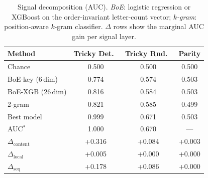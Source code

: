 \begin{table}[t]
\centering
\small
\caption{Signal decomposition (AUC). \emph{BoE}: logistic regression or XGBoost on the order-invariant letter-count vector; \emph{$k$-gram}: position-aware $k$-gram classifier. $\Delta$ rows show the marginal AUC gain per signal layer.}
\label{tab:signal_decomposition}
\begin{tabular}{l c c c}
\toprule
Method & Tricky Det.\ & Tricky Rnd.\ & Parity \\
\midrule
Chance & 0.500 & 0.500 & 0.500 \\
BoE-key (6\,dim) & 0.774 & 0.574 & 0.503 \\
BoE-XGB (26\,dim) & 0.816 & 0.584 & 0.503 \\
2-gram & 0.821 & 0.585 & 0.499 \\
Best model & 0.999 & 0.671 & 0.503 \\
\midrule
AUC$^*$ & 1.000 & 0.670 & --- \\
\midrule
$\Delta_{\text{content}}$ & +0.316 & +0.084 & +0.003 \\
$\Delta_{\text{local}}$ & +0.005 & +0.000 & +0.000 \\
$\Delta_{\text{seq}}$ & +0.178 & +0.086 & +0.000 \\
\bottomrule
\end{tabular}
\end{table}